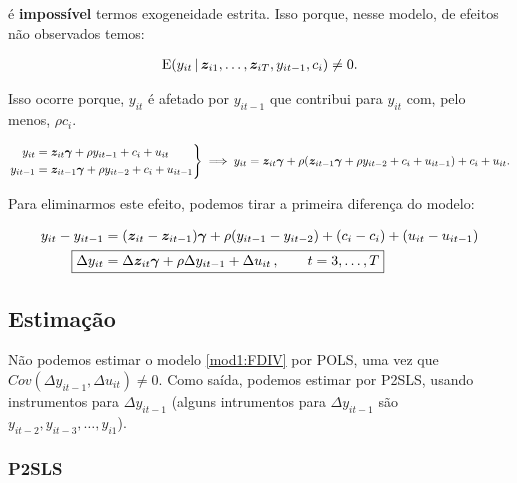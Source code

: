 \documentclass[11pt, oneside, a4paper, article]{article}
\numberwithin{equation}{section}
\begin{document}
\begin{description}
\noindent
é \textbf{impossível} termos exogeneidade estrita.
Isso porque, nesse modelo, de efeitos não observados temos:

\vspace{-1.5 em}
\begin{align*}
\text{E}( y_{it} \, | \, \boldsymbol{z}_{i1}, \dots, \boldsymbol{z}_{iT}, y_{it-1}, c_{i}) \neq 0.
\end{align*}

\noindent
Isso ocorre porque, $y_{it}$ é afetado por $y_{it-1}$ que contribui para $y_{it}$ com, pelo menos, $\rho c_{i}$.

\begin{equation*}
\left.
\begin{aligned}
y_{it} &= \boldsymbol{z}_{it} \boldsymbol{\gamma} + \rho y_{i t - 1} + c_{i} + u_{it}
\\
y_{it-1} &= \boldsymbol{z}_{it-1} \boldsymbol{\gamma} + \rho y_{i t - 2} + c_{i} + u_{it-1}
\end{aligned}
\right\} 
\implies
y_{it} = \boldsymbol{z}_{it} \boldsymbol{\gamma} +
\rho (\boldsymbol{z}_{it-1} \boldsymbol{\gamma} + \rho y_{i t - 2} + c_{i} + u_{it-1})
+ c_{i} + u_{it}.
\end{equation*}

Para eliminarmos este efeito, podemos tirar a primeira diferença do modelo:

\vspace{-1 em}
\begin{align}
\nonumber
y_{it} - y_{it-1} &= 
(\mbs{z}_{it} - \mbs{z}_{it-1}) \mbs{\gamma} +
\rho (y_{i t - 1} -  y_{i t - 2} ) +
(c_{i} - c_{i}) + (u_{it} - u_{it-1})
\\
\label{mod1:FDIV}
\Aboxed{
\Delta y_{it} &= 
\Delta \mbs{z}_{it} \mbs{\gamma} + \rho \Delta y_{i t - 1} + \Delta u_{it}
\, , \qquad t=3, \dots, T}
\end{align}

\subsection{Estimação}

Não podemos estimar o modelo \eqref{mod1:FDIV} por POLS, uma vez que $Cov(\Delta y_{it-1}, \Delta u_{it} ) \neq 0$.
Como saída, podemos estimar por P2SLS, usando instrumentos para $\Delta y_{it-1}$ (alguns intrumentos para $\Delta y_{it-1}$ são $y_{it-2}, y_{it-3}, \dots, y_{i1}$).

\subsubsection{P2SLS}


\end{description}
\end{document}

